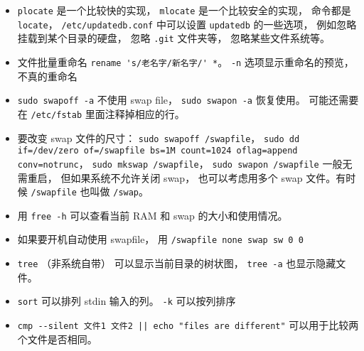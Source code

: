 \begin{itemize}
\item \verb|plocate| 是一个比较快的实现， \verb|mlocate| 是一个比较安全的实现， 命令都是 \verb|locate|， \verb|/etc/updatedb.conf| 中可以设置 \verb|updatedb| 的一些选项， 例如忽略挂载到某个目录的硬盘， 忽略 \verb|.git| 文件夹等， 忽略某些文件系统等。
\item 文件批量重命名 \verb|rename 's/老名字/新名字/' *|。 \verb|-n| 选项显示重命名的预览， 不真的重命名
\item \verb|sudo swapoff -a| 不使用 swap file， \verb|sudo swapon -a| 恢复使用。 可能还需要在 \verb|/etc/fstab| 里面注释掉相应的行。
\item 要改变 swap 文件的尺寸： \verb|sudo swapoff /swapfile|， \verb|sudo dd if=/dev/zero of=/swapfile bs=1M count=1024 oflag=append conv=notrunc|， \verb|sudo mkswap /swapfile|， \verb|sudo swapon /swapfile| 一般无需重启， 但如果系统不允许关闭 swap， 也可以考虑用多个 swap 文件。有时候 \verb|/swapfile| 也叫做 \verb|/swap|。
\item 用 \verb|free -h| 可以查看当前 RAM 和 swap 的大小和使用情况。
\item 如果要开机自动使用 swapfile， 用 \verb|/swapfile none swap sw 0 0|
\item \verb|tree| （非系统自带） 可以显示当前目录的树状图， \verb|tree -a| 也显示隐藏文件。
\item \verb|sort| 可以排列 stdin 输入的列。 \verb|-k| 可以按列排序
\item \verb`cmp --silent 文件1 文件2 || echo "files are different"` 可以用于比较两个文件是否相同。
\end{itemize}

